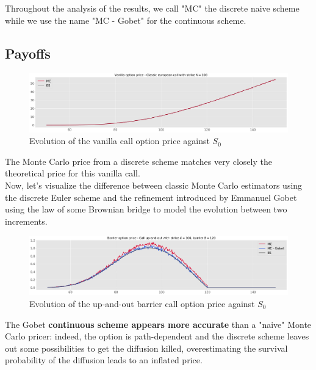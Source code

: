 Throughout the analysis of the results, we call "MC" the discrete naive scheme while we use the name "MC - Gobet" for the continuous scheme.




\subsection{Payoffs}

\begin{figure}[H]
    \centering
    \includegraphics[width=1\linewidth]{img/vanilla_call.pdf}
    \caption{Evolution of the vanilla call option price against $S_0$}
    \label{fig:callmc}
\end{figure}

The Monte Carlo price from a discrete scheme matches very closely the theoretical price for this vanilla call.\\

Now, let's visualize the difference between classic Monte Carlo estimators using the discrete Euler scheme and the refinement introduced by Emmanuel Gobet using the law of some Brownian bridge to model the evolution between two increments.

\begin{figure}[H]
    \centering
    \includegraphics[width=1\linewidth]{img/cuo_mc.pdf}
    \caption{Evolution of the up-and-out barrier call option price against $S_0$}
    \label{fig:upandoutmc}
\end{figure}

The Gobet \textbf{continuous scheme appears more accurate} than a "naive" Monte Carlo pricer: indeed, the option is path-dependent and the discrete scheme leaves out some possibilities to get the diffusion killed, overestimating the survival probability of the diffusion leads to an inflated price.\\

